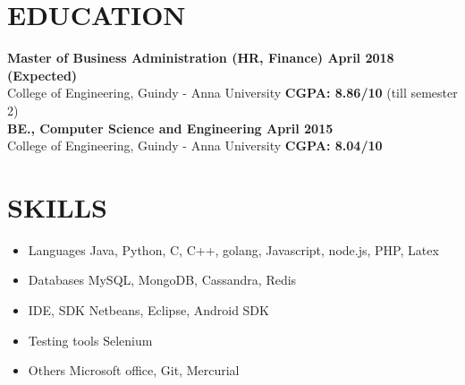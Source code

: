 \documentclass[11pt,a4paper]{article}
\begin{document}
\section*{EDUCATION}
\textbf{Master of Business Administration (HR, Finance) {\hfill April 2018 (Expected)}}\\
College of Engineering, Guindy - Anna University {\hfill \textbf{CGPA: 8.86/10} (till semester 2)}\\
\textbf{BE., Computer Science and Engineering {\hfill April 2015}}\\
College of Engineering, Guindy - Anna University {\hfill \textbf{CGPA: 8.04/10}}\\
\section*{SKILLS}
\TabPositions{3cm}
\begin{itemize}[noitemsep]
\item Languages \tab Java, Python, C, C++, golang, Javascript, node.js, PHP, Latex
\item Databases \tab MySQL, MongoDB, Cassandra, Redis
\item IDE, SDK \tab Netbeans, Eclipse, Android SDK
\item Testing tools \tab Selenium
\item Others \tab Microsoft office, Git, Mercurial
\end{itemize}
\end{document}
